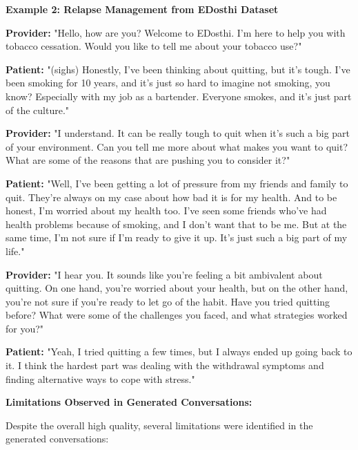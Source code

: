\begin{mdframed}[linecolor=black, linewidth=1pt, backgroundcolor=gray!5, roundcorner=10pt, innerleftmargin=10pt, innerrightmargin=10pt]
\textbf{Example 2: Relapse Management from EDosthi Dataset}

{\footnotesize
\textbf{Provider:} "Hello, how are you? Welcome to EDosthi. I'm here to help you with tobacco cessation. Would you like to tell me about your tobacco use?"

\textbf{Patient:} "(sighs) Honestly, I've been thinking about quitting, but it's tough. I've been smoking for 10 years, and it's just so hard to imagine not smoking, you know? Especially with my job as a bartender. Everyone smokes, and it's just part of the culture."

\textbf{Provider:} "I understand. It can be really tough to quit when it's such a big part of your environment. Can you tell me more about what makes you want to quit? What are some of the reasons that are pushing you to consider it?"

\textbf{Patient:} "Well, I've been getting a lot of pressure from my friends and family to quit. They're always on my case about how bad it is for my health. And to be honest, I'm worried about my health too. I've seen some friends who've had health problems because of smoking, and I don't want that to be me. But at the same time, I'm not sure if I'm ready to give it up. It's just such a big part of my life."

\textbf{Provider:} "I hear you. It sounds like you're feeling a bit ambivalent about quitting. On one hand, you're worried about your health, but on the other hand, you're not sure if you're ready to let go of the habit. Have you tried quitting before? What were some of the challenges you faced, and what strategies worked for you?"

\textbf{Patient:} "Yeah, I tried quitting a few times, but I always ended up going back to it. I think the hardest part was dealing with the withdrawal symptoms and finding alternative ways to cope with stress."
}
\end{mdframed}

\textbf{Limitations Observed in Generated Conversations:}

Despite the overall high quality, several limitations were identified in the generated conversations:

